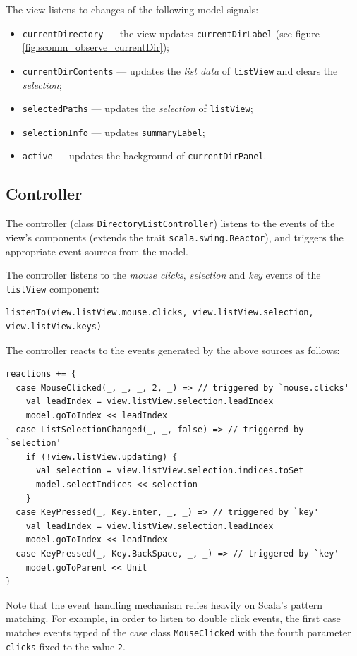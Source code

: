 The view listens to changes of the following model signals:
\begin{itemize}
\item \texttt{currentDirectory} --- the view updates \texttt{currentDirLabel} (see figure \ref{fig:scomm_observe_currentDir});
\item \texttt{currentDirContents} --- updates the \emph{list data} of \texttt{listView} and clears the \emph{selection};
\item \texttt{selectedPaths} --- updates the \emph{selection} of \texttt{listView};
\item \texttt{selectionInfo} --- updates \texttt{summaryLabel};
\item \texttt{active} --- updates the background of \texttt{currentDirPanel}.
\end{itemize}

\subsection{Controller}

The controller (class \texttt{DirectoryListController}) listens to the events of the view's components (extends the trait \texttt{scala.swing.Reactor}), and triggers the appropriate event sources from the model. 

The controller listens to the \emph{mouse clicks}, \emph{selection} and \emph{key} events of the \texttt{listView} component:
\begin{lstlisting}
listenTo(view.listView.mouse.clicks, view.listView.selection, view.listView.keys)
\end{lstlisting}


The controller reacts to the events generated by the above sources as follows:
\begin{lstlisting}
reactions += {
  case MouseClicked(_, _, _, 2, _) => // triggered by `mouse.clicks'
    val leadIndex = view.listView.selection.leadIndex
    model.goToIndex << leadIndex
  case ListSelectionChanged(_, _, false) => // triggered by `selection'
    if (!view.listView.updating) {
      val selection = view.listView.selection.indices.toSet
      model.selectIndices << selection
    }
  case KeyPressed(_, Key.Enter, _, _) => // triggered by `key'
    val leadIndex = view.listView.selection.leadIndex
    model.goToIndex << leadIndex
  case KeyPressed(_, Key.BackSpace, _, _) => // triggered by `key'
    model.goToParent << Unit
}
\end{lstlisting}

Note that the event handling mechanism relies heavily on Scala's pattern matching. For example, in order to listen to double click events, the first case matches events typed of the case class \texttt{MouseClicked} with the fourth parameter \texttt{clicks} fixed to the value \texttt{2}. 

